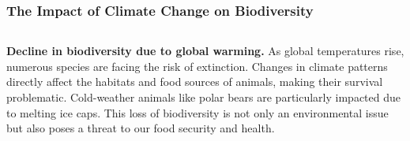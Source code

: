 \documentclass[5pt]{beamer}
\begin{document}
\begin{frame}
\frametitle{The Impact of Climate Change on Biodiversity}
\begin{columns}
\begin{column}{0.7\textwidth}
\begin{block}{\textbf{Decline in biodiversity due to global warming.}}
As global temperatures rise, numerous species are facing the risk of extinction. Changes in climate patterns directly affect the habitats and food sources of animals, making their survival problematic. Cold-weather animals like polar bears are particularly impacted due to melting ice caps. This loss of biodiversity is not only an environmental issue but also poses a threat to our food security and health.
\end{block}
\end{column}
\end{columns}
\end{frame}
\end{document}
